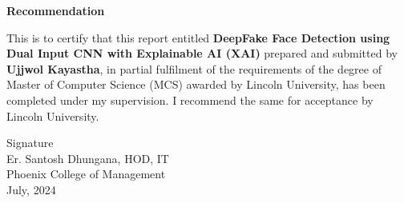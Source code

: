 \pagestyle{plain}
\vspace*{52pt}
\begin{center}
    \large{\textbf{Recommendation}}\\[31pt]
\end{center}

This is to certify that this report entitled \textbf{DeepFake Face Detection using  Dual Input CNN with Explainable AI (XAI)} prepared
and submitted by \textbf{Ujjwol Kayastha}, in partial fulfilment of the requirements of the degree of Master of Computer Science (MCS) awarded by Lincoln University, has been completed under my supervision. I recommend the same for acceptance by Lincoln University.

\vspace{73pt}

\begin{flushleft}
    Signature \\
    Er. Santosh Dhungana, HOD, IT\\
    Phoenix College of Management\\
    July, 2024
\end{flushleft}

